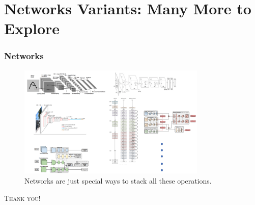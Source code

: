 \documentclass[10pt]{beamer}
\begin{document}
\section{Networks Variants: Many More to Explore}
\begin{frame}
\frametitle{Networks}
\begin{figure}[H]
	\centerline{
		\includegraphics[width=0.8\textwidth]{networks.png}
	}
	\caption{Networks are just special ways to stack all these operations.}
\end{figure}
\end{frame}


\begin{frame}
	\begin{center}
		{\textcolor[rgb]{1 0 0}{\Huge\textsc{Thank you!}}}\bigskip
	\end{center}
\end{frame}
\end{document}
